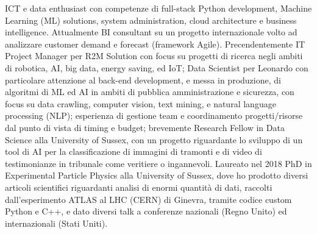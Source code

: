 
ICT e data enthusiast con competenze di full-stack Python development, Machine Learning (ML) solutions, system administration, cloud architecture e business intelligence. Attualmente BI consultant su un progetto internazionale volto ad analizzare customer demand e forecast (framework Agile). Precendentemente IT Project Manager per R2M Solution con focus su progetti di ricerca negli ambiti di robotica, AI, big data, energy saving, ed IoT; Data Scientist per Leonardo con particolare attenzione al back-end development, e messa in produzione, di algoritmi di ML ed AI in ambiti di pubblica amministrazione e sicurezza, con focus su data crawling, computer vision, text mining, e natural language processing (NLP); esperienza di gestione team e coordinamento progetti/risorse dal punto di vista di timing e budget; brevemente Research Fellow in Data Science alla University of Sussex, con un progetto riguardante lo sviluppo di un tool di AI per la classificazione di immagini di tramonti e di video di testimonianze in tribunale come veritiere o ingannevoli. Laureato nel 2018 PhD in Experimental Particle Physics alla University of Sussex, dove ho prodotto diversi articoli scientifici riguardanti analisi di enormi quantità di dati, raccolti dall'esperimento ATLAS al LHC (CERN) di Ginevra, tramite codice custom Python e C++, e dato diversi talk a conferenze nazionali (Regno Unito) ed internazionali (Stati Uniti).